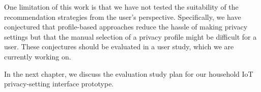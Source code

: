 One limitation of this work is that we have not tested the suitability of the recommendation strategies from the user's perspective. Specifically, we have conjectured that profile-based approaches reduce the hassle of making privacy settings but that the manual selection of a privacy profile might be difficult for a user. These conjectures should be evaluated in a user study, which we are currently working on.

In the next chapter, we discuss the evaluation study plan for our household IoT privacy-setting interface prototype.
